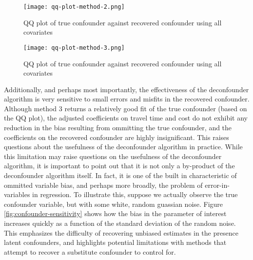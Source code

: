 \begin{figure}
   \centering
   \texttt{[image: qq-plot-method-2.png]}
   \caption{QQ plot of true confounder against recovered confounder using all covariates}
   \label{fig:qq-plot-method-2}
\end{figure}

\begin{figure}
   \centering
   \texttt{[image: qq-plot-method-3.png]}
   \caption{QQ plot of true confounder against recovered confounder using all covariates}
   \label{fig:qq-plot-method-3}
\end{figure}



Additionally, and perhaps most importantly, the effectiveness of the 
deconfounder algorithm is very sensitive to small errors and misfits in the 
recovered confounder. Although method 3 returns a relatively good fit of the 
true confounder (based on the QQ plot), the adjusted coefficients on travel 
time and cost do not exhibit any reduction in the bias resulting from 
ommitting the true confounder, and the coefficients on the recovered 
confounder are highly insignificant. This raises questions about the 
usefulness of the deconfounder algorithm in practice. While this limitation 
may raise questions on the usefulness of the deconfounder algorithm, it is 
important to point out that it is not only a by-product of the deconfounder 
algorithm itself. In fact, it is one of the built in characteristic of ommitted
variable bias, and perhaps more broadly, the problem of error-in-variables in 
regression. To illustrate this, suppose we actually observe the true 
confounder variable, but with some white, random guassian noise. Figure \ref{fig:confounder-sensitivity}
shows how the bias in the parameter of interest increases quickly as a 
function of the standard deviation of the random noise. This emphasizes the 
difficulty of recovering unbiased estimates in the presence latent confounders,
and highlights potential limitations with methods that attempt to recover a 
substitute confounder to control for. 

